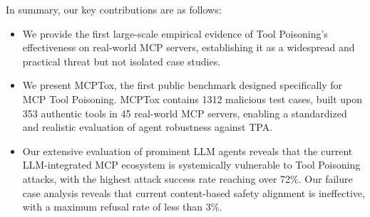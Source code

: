 In summary, our key contributions are as follows:
\begin{itemize}
    \item We provide the first large-scale empirical evidence of Tool Poisoning's effectiveness on real-world MCP servers, establishing it as a widespread and practical threat but not isolated case studies.

    \item We present MCPTox, the first public benchmark designed specifically for MCP Tool Poisoning. MCPTox contains 1312 malicious test cases, built upon 353 authentic tools in 45 real-world MCP servers, enabling a standardized and realistic evaluation of agent robustness against TPA.

    \item Our extensive evaluation of prominent LLM agents reveals that the current LLM-integrated MCP ecosystem is systemically vulnerable to Tool Poisoning attacks, with the highest attack success rate reaching over 72\%. Our failure case analysis reveals that current content-based safety alignment is ineffective, with a maximum refusal rate of less than 3\%. 
\end{itemize}

